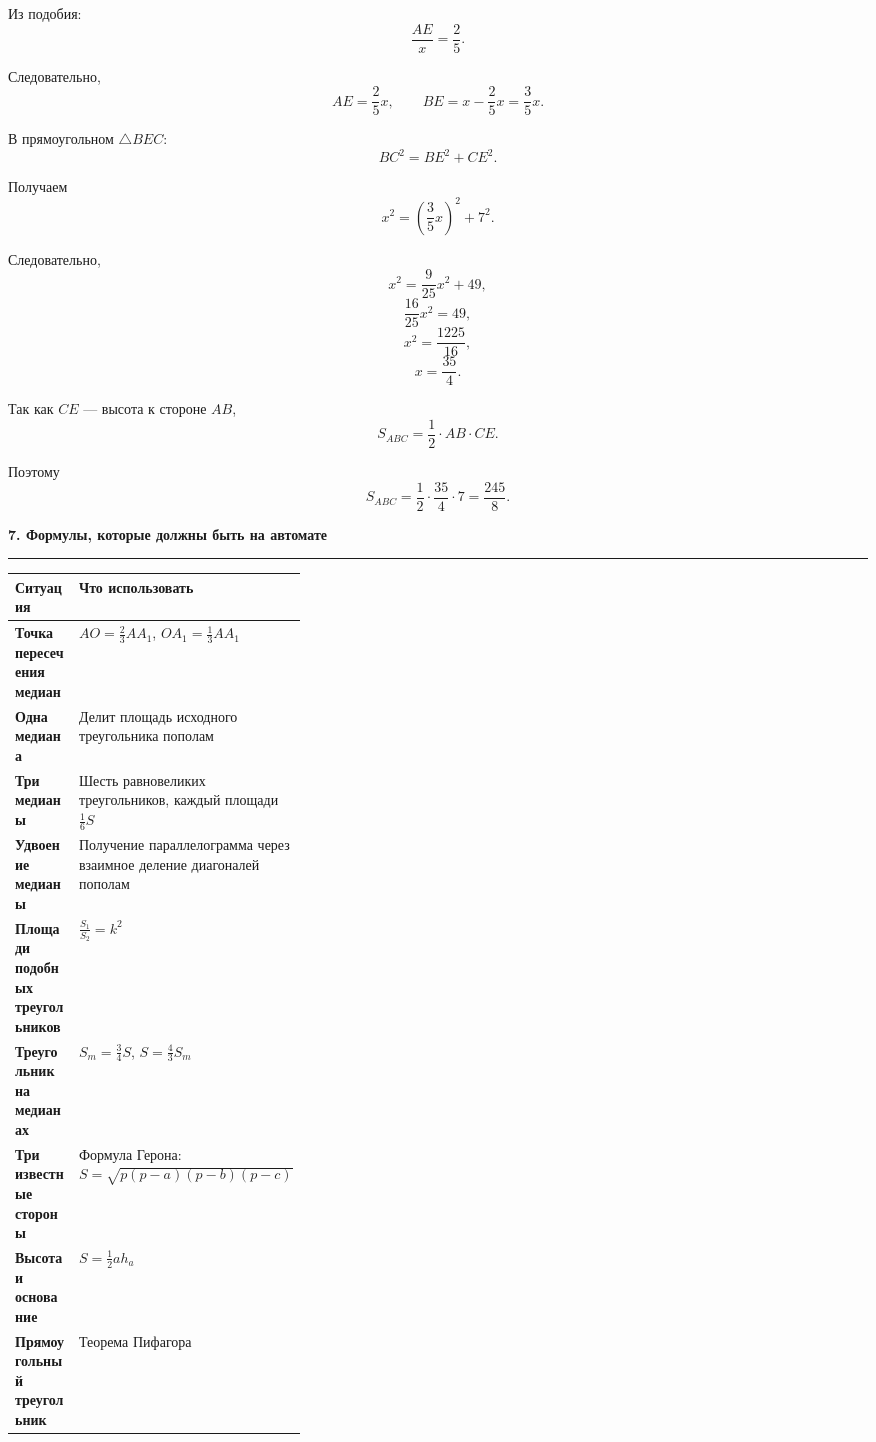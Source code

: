\documentclass[a4paper,12pt]{article}
\newcommand{\checksection}[1]{%
  \vspace{0.7em}%
  {\Large\bfseries\color{darkaccent}#1}\par
  \vspace{0.25em}
  {\color{rulegray}\rule{\linewidth}{0.6pt}}\par
  \vspace{0.5em}
}
\begin{document}
Из подобия:
\[
\frac{AE}{x}
=
\frac25.
\]

Следовательно,
\[
AE=\frac25x,
\qquad
BE=x-\frac25x=\frac35x.
\]

В прямоугольном $\triangle BEC$:
\[
BC^2=BE^2+CE^2.
\]

Получаем
\[
x^2
=
\left(\frac35x\right)^2
+
7^2.
\]

Следовательно,
\[
x^2
=
\frac9{25}x^2+49,
\]
\[
\frac{16}{25}x^2=49,
\]
\[
x^2=\frac{1225}{16},
\]
\[
x=\frac{35}{4}.
\]

Так как $CE$ --- высота к стороне $AB$,
\[
S_{ABC}
=
\frac12\cdot AB\cdot CE.
\]

Поэтому
\[
S_{ABC}
=
\frac12
\cdot
\frac{35}{4}
\cdot
7
=
\boxed{\frac{245}{8}}.
\]


\checksection{7. Формулы, которые должны быть на автомате}

\renewcommand{\arraystretch}{1.35}

\begin{center}
\begin{tabularx}{\linewidth}{@{}>{\bfseries}p{0.34\linewidth}X@{}}

\toprule
Ситуация & Что использовать \\
\midrule

Точка пересечения медиан
&
$AO=\frac23AA_1$,
$OA_1=\frac13AA_1$
\\

Одна медиана
&
Делит площадь исходного треугольника пополам
\\

Три медианы
&
Шесть равновеликих треугольников,
каждый площади $\frac16S$
\\

Удвоение медианы
&
Получение параллелограмма через взаимное деление
диагоналей пополам
\\

Площади подобных треугольников
&
$\displaystyle \frac{S_1}{S_2}=k^2$
\\

Треугольник на медианах
&
$S_m=\frac34S$,
\quad
$S=\frac43S_m$
\\

Три известные стороны
&
Формула Герона:
$\displaystyle
S=\sqrt{p(p-a)(p-b)(p-c)}
$
\\

Высота и основание
&
$\displaystyle S=\frac12ah_a$
\\

Прямоугольный треугольник
&
Теорема Пифагора
\\

\bottomrule

\end{tabularx}
\end{center}
\end{document}
